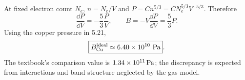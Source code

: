 At fixed electron count $N_e$,
$n=N_e/V$ and
$P=Cn^{5/3}=CN_e^{5/3}V^{-5/3}$.
Therefore
\begin{equation}
\frac{\dd P}{\dd V}=-\frac53\frac{P}{V},
\qquad
\boxed{B=-V\frac{\dd P}{\dd V}
=\frac53P}.
\end{equation}
Using the copper pressure in 5.21,
\begin{equation}
\boxed{B_{\rm Cu}^{\rm ideal}
\simeq6.40\times10^{10}\ {\rm Pa}}.
\end{equation}
The textbook's comparison value is
$1.34\times10^{11}\,{\rm Pa}$;
the discrepancy is expected from
interactions and band structure
neglected by the gas model.
